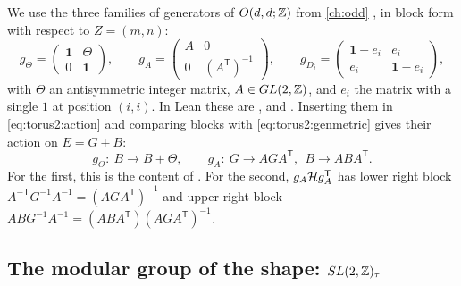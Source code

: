 We use the three families of generators of $O(d,d;\mathbb{Z})$ from \cref{ch:odd}
, in block form with
respect to $Z=(m,n)$:
\begin{equation}\label{eq:torus2:gens}
 g_\Theta=\begin{pmatrix}\mathbf 1&\Theta\\0&\mathbf 1\end{pmatrix},\qquad
 g_A=\begin{pmatrix}A&0\\0&(A^{\mathsf T})^{-1}\end{pmatrix},\qquad
 g_{D_i}=\begin{pmatrix}\mathbf 1-e_i&e_i\\e_i&\mathbf 1-e_i\end{pmatrix},
\end{equation}
with $\Theta$ an antisymmetric integer matrix, $A\in GL(2,\mathbb{Z})$, and $e_i$ the matrix with a
single $1$ at position $(i,i)$. In Lean these are ,  and
. Inserting them in \eqref{eq:torus2:action} and comparing blocks with
\eqref{eq:torus2:genmetric} gives their action on $E=G+B$:
\begin{equation}\label{eq:torus2:Eaction}
 g_\Theta:\ B\to B+\Theta,\qquad g_A:\ G\to AGA^{\mathsf T},\ \ B\to ABA^{\mathsf T}.
\end{equation}
For the first, this is the content of  \TA. For the second,
$g_A\mathcal{H} g_A^{\mathsf T}$ has lower right block $A^{-\mathsf T}G^{-1}A^{-1}=(AGA^{\mathsf T})^{-1}$
and upper right block $ABG^{-1}A^{-1}=(ABA^{\mathsf T})(AGA^{\mathsf T})^{-1}$.

\subsection{The modular group of the shape: \texorpdfstring{$SL(2,\mathbb{Z})_\tau$}{SL(2,Z) tau}}

